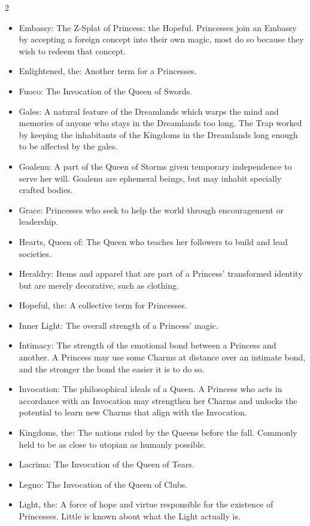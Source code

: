 \begin{multicols}{2}
\begin{itemize}
  \item Embassy: The Z-Splat of Princess: the Hopeful. Princesses join an Embassy by accepting a foreign concept into their own magic, most do so because they wish to redeem that concept. 
  \item Enlightened, the: Another term for a Princesses. 
  \item Fuoco: The Invocation of the Queen of Swords.
  \item Gales: A natural feature of the Dreamlands which warps the mind and memories of anyone who stays in the Dreamlands too long. The Trap worked by keeping the inhabitants of the Kingdoms in the Dreamlands long enough to be affected by the gales. 
  \item Goalenu: A part of the Queen of Storms given temporary independence to serve her will. Goalenu are ephemeral beings, but may inhabit specially crafted bodies. 
  \item Grace: Princesses who seek to help the world through encouragement or leadership. 
  \item Hearts, Queen of: The Queen who teaches her followers to build and lead societies.
  \item Heraldry: Items and apparel that are part of a Princess' transformed identity but are merely decorative, such as clothing. 
  \item Hopeful, the: A collective term for Princesses. 
  \item Inner Light: The overall strength of a Princess' magic. 
  \item Intimacy: The strength of the emotional bond between a Princess and another. A Princess may use some Charms at distance over an intimate bond, and the stronger the bond the easier it is to do so. 
  \item Invocation: The philosophical ideals of a Queen. A Princess who acts in accordance with an Invocation may strengthen her Charms and unlocks the potential to learn new Charms that align with the Invocation. 
  \item Kingdoms, the: The nations ruled by the Queens before the fall. Commonly held to be as close to utopian as humanly possible.
  \item Lacrima: The Invocation of the Queen of Tears.
  \item Legno: The Invocation of the Queen of Clubs.
  \item Light, the: A force of hope and virtue responsible for the existence of Princesses. Little is known about what the Light actually is.

\end{itemize}
\end{multicols}
